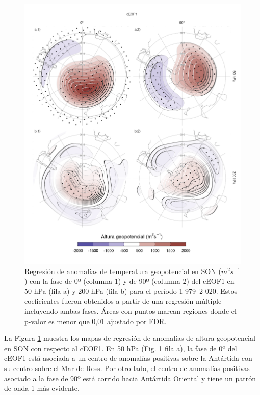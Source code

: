 \documentclass[12pt,oneside,a4paper]{reedthesis}
\begin{document}
\begin{figure}

{\centering \includegraphics{figures/20-ceofs/eof1-regr-gh-1} 

}

\caption{Regresión de anomalías de temperatura geopotencial en SON (\(m^2s^{-1}\)) con la fase de 0º (columna 1) y de 90º (columna 2) del cEOF1 en 50 hPa (fila a) y 200 hPa (fila b) para el período 1 979--2 020. Estos coeficientes fueron obtenidos a partir de una regresión múltiple incluyendo ambas fases. Áreas con puntos marcan regiones donde el p-valor es menor que 0,01 ajustado por FDR.}\label{fig:eof1-regr-gh}
\end{figure}

La Figura \ref{fig:eof1-regr-gh} muestra los mapas de regresión de anomalías de altura geopotencial en SON con respecto al cEOF1.
En 50 hPa (Fig. \ref{fig:eof1-regr-gh} fila a), la fase de 0º del cEOF1 está asociada a un centro de anomalías positivas sobre la Antártida con su centro sobre el Mar de Ross.
Por otro lado, el centro de anomalías positivas asociado a la fase de 90º está corrido hacia Antártida Oriental y tiene un patrón de onda 1 más evidente.
\end{document}
